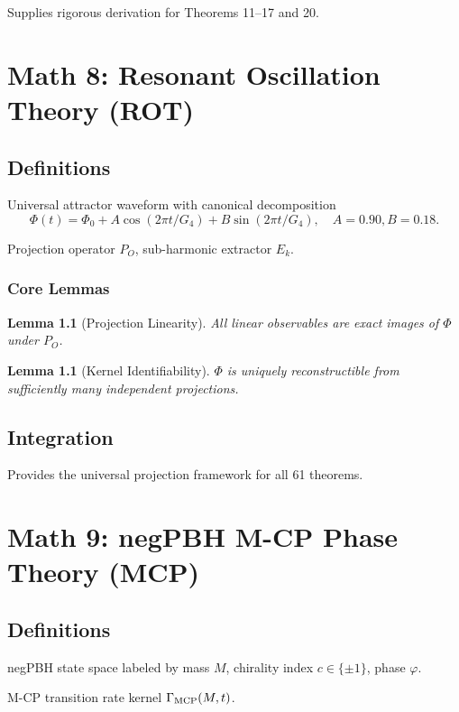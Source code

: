 \documentclass[11pt,a4paper]{book}
\newtheorem{lemma}[theorem]{Lemma}
\theoremstyle{remark}
\theoremstyle{definition}
\begin{document}
Supplies rigorous derivation for Theorems 11–17 and 20.

\chapter{Math 8: Resonant Oscillation Theory (ROT)}

\section{Definitions}

Universal attractor waveform with canonical decomposition
\[ \Phi(t) = \Phi_0 + A \cos(2\pi t / G_4) + B \sin(2\pi t / G_4), \quad A=0.90, B=0.18. \]

Projection operator \(P_O\), sub-harmonic extractor \(E_k\).

\subsection{Core Lemmas}

\begin{lemma}[Projection Linearity]
All linear observables are exact images of \(\Phi\) under \(P_O\).
\end{lemma}

\begin{lemma}[Kernel Identifiability]
\(\Phi\) is uniquely reconstructible from sufficiently many independent projections.
\end{lemma}

\section{Integration}

Provides the universal projection framework for all 61 theorems.

\chapter{Math 9: negPBH M-CP Phase Theory (MCP)}

\section{Definitions}

negPBH state space labeled by mass \(M\), chirality index \(c \in \{\pm 1\}\), phase \(\varphi\).

M-CP transition rate kernel \(\Gamma_{\rm MCP}(M,t)\).
\end{document}

